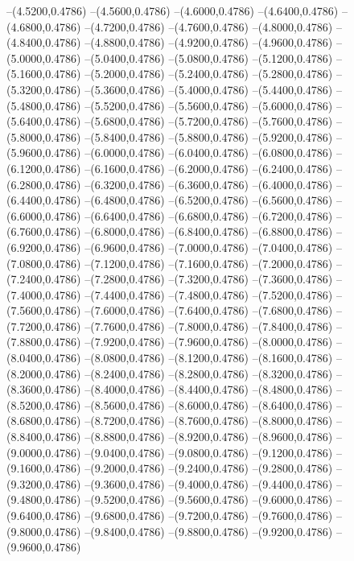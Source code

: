 {	--(4.5200,0.4786)
	--(4.5600,0.4786)
	--(4.6000,0.4786)
	--(4.6400,0.4786)
	--(4.6800,0.4786)
	--(4.7200,0.4786)
	--(4.7600,0.4786)
	--(4.8000,0.4786)
	--(4.8400,0.4786)
	--(4.8800,0.4786)
	--(4.9200,0.4786)
	--(4.9600,0.4786)
	--(5.0000,0.4786)
	--(5.0400,0.4786)
	--(5.0800,0.4786)
	--(5.1200,0.4786)
	--(5.1600,0.4786)
	--(5.2000,0.4786)
	--(5.2400,0.4786)
	--(5.2800,0.4786)
	--(5.3200,0.4786)
	--(5.3600,0.4786)
	--(5.4000,0.4786)
	--(5.4400,0.4786)
	--(5.4800,0.4786)
	--(5.5200,0.4786)
	--(5.5600,0.4786)
	--(5.6000,0.4786)
	--(5.6400,0.4786)
	--(5.6800,0.4786)
	--(5.7200,0.4786)
	--(5.7600,0.4786)
	--(5.8000,0.4786)
	--(5.8400,0.4786)
	--(5.8800,0.4786)
	--(5.9200,0.4786)
	--(5.9600,0.4786)
	--(6.0000,0.4786)
	--(6.0400,0.4786)
	--(6.0800,0.4786)
	--(6.1200,0.4786)
	--(6.1600,0.4786)
	--(6.2000,0.4786)
	--(6.2400,0.4786)
	--(6.2800,0.4786)
	--(6.3200,0.4786)
	--(6.3600,0.4786)
	--(6.4000,0.4786)
	--(6.4400,0.4786)
	--(6.4800,0.4786)
	--(6.5200,0.4786)
	--(6.5600,0.4786)
	--(6.6000,0.4786)
	--(6.6400,0.4786)
	--(6.6800,0.4786)
	--(6.7200,0.4786)
	--(6.7600,0.4786)
	--(6.8000,0.4786)
	--(6.8400,0.4786)
	--(6.8800,0.4786)
	--(6.9200,0.4786)
	--(6.9600,0.4786)
	--(7.0000,0.4786)
	--(7.0400,0.4786)
	--(7.0800,0.4786)
	--(7.1200,0.4786)
	--(7.1600,0.4786)
	--(7.2000,0.4786)
	--(7.2400,0.4786)
	--(7.2800,0.4786)
	--(7.3200,0.4786)
	--(7.3600,0.4786)
	--(7.4000,0.4786)
	--(7.4400,0.4786)
	--(7.4800,0.4786)
	--(7.5200,0.4786)
	--(7.5600,0.4786)
	--(7.6000,0.4786)
	--(7.6400,0.4786)
	--(7.6800,0.4786)
	--(7.7200,0.4786)
	--(7.7600,0.4786)
	--(7.8000,0.4786)
	--(7.8400,0.4786)
	--(7.8800,0.4786)
	--(7.9200,0.4786)
	--(7.9600,0.4786)
	--(8.0000,0.4786)
	--(8.0400,0.4786)
	--(8.0800,0.4786)
	--(8.1200,0.4786)
	--(8.1600,0.4786)
	--(8.2000,0.4786)
	--(8.2400,0.4786)
	--(8.2800,0.4786)
	--(8.3200,0.4786)
	--(8.3600,0.4786)
	--(8.4000,0.4786)
	--(8.4400,0.4786)
	--(8.4800,0.4786)
	--(8.5200,0.4786)
	--(8.5600,0.4786)
	--(8.6000,0.4786)
	--(8.6400,0.4786)
	--(8.6800,0.4786)
	--(8.7200,0.4786)
	--(8.7600,0.4786)
	--(8.8000,0.4786)
	--(8.8400,0.4786)
	--(8.8800,0.4786)
	--(8.9200,0.4786)
	--(8.9600,0.4786)
	--(9.0000,0.4786)
	--(9.0400,0.4786)
	--(9.0800,0.4786)
	--(9.1200,0.4786)
	--(9.1600,0.4786)
	--(9.2000,0.4786)
	--(9.2400,0.4786)
	--(9.2800,0.4786)
	--(9.3200,0.4786)
	--(9.3600,0.4786)
	--(9.4000,0.4786)
	--(9.4400,0.4786)
	--(9.4800,0.4786)
	--(9.5200,0.4786)
	--(9.5600,0.4786)
	--(9.6000,0.4786)
	--(9.6400,0.4786)
	--(9.6800,0.4786)
	--(9.7200,0.4786)
	--(9.7600,0.4786)
	--(9.8000,0.4786)
	--(9.8400,0.4786)
	--(9.8800,0.4786)
	--(9.9200,0.4786)
	--(9.9600,0.4786)
}
